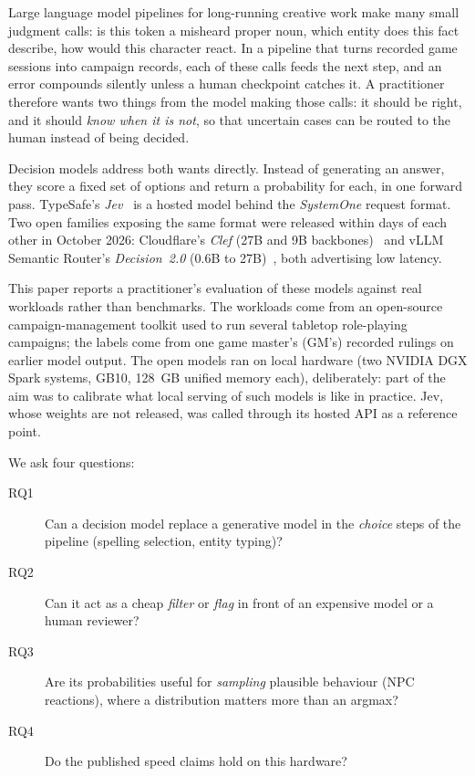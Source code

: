 \documentclass[11pt]{article}
\begin{document}
Large language model pipelines for long-running creative work make many small judgment calls: is this
token a misheard proper noun, which entity does this fact describe, how would this character react.
In a pipeline that turns recorded game sessions into campaign records, each of these calls feeds
the next step, and an error compounds silently unless a human checkpoint catches it. A practitioner
therefore wants two things from the model making those calls: it should be right, and it should
\emph{know when it is not}, so that uncertain cases can be routed to the human instead of being
decided.

Decision models address both wants directly. Instead of generating an answer, they score a fixed set of options
and return a probability for each, in one forward pass. TypeSafe's \emph{Jev}~\cite{typesafe} is a
hosted model behind the \emph{SystemOne} request format. Two open families exposing the same format were released within days
of each other in October 2026: Cloudflare's \emph{Clef} (27B and 9B
backbones)~\cite{clef} and vLLM Semantic Router's \emph{Decision~2.0} (0.6B to 27B)~\cite{decision2},
both advertising low latency.

This paper reports a practitioner's evaluation of these models against real workloads rather than
benchmarks. The workloads come from an open-source campaign-management toolkit used to run several
tabletop role-playing campaigns; the labels come from one game master's (GM's) recorded rulings on
earlier model output. The open models ran on local hardware (two NVIDIA DGX Spark systems, GB10,
128~GB unified memory each), deliberately: part of the aim was to calibrate what local serving of
such models is like in practice. Jev, whose weights are not released, was called through its
hosted API as a reference point.

We ask four questions:
\begin{description}
  \item[RQ1] Can a decision model replace a generative model in the \emph{choice} steps of the
        pipeline (spelling selection, entity typing)?
  \item[RQ2] Can it act as a cheap \emph{filter} or \emph{flag} in front of an expensive model or a
        human reviewer?
  \item[RQ3] Are its probabilities useful for \emph{sampling} plausible behaviour (NPC reactions),
        where a distribution matters more than an argmax?
  \item[RQ4] Do the published speed claims hold on this hardware?
\end{description}
\end{document}
